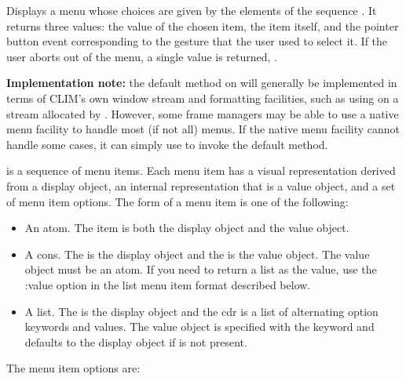 Displays a menu whose choices are given by the elements of the sequence
.  It returns three values:  the value of the chosen item, the item
itself, and the pointer button event corresponding to the gesture that the user
used to select it.  If the user aborts out of the menu, a single value is
returned, .

{\bf Implementation note:} the default method on 
will generally be implemented in terms of CLIM's own window stream and
formatting facilities, such as using  on a stream
allocated by .  However, some frame managers may be able to use a
native menu facility to handle most (if not all) menus.  If the native menu
facility cannot handle some cases, it can simply use  to
invoke the default method.

 is a sequence of menu items.  Each menu item has a visual
representation derived from a display object, an internal representation that is
a value object, and a set of menu item options.  The form of a menu item is one
of the following:

\begin{itemize}
\item An atom. The item is both the display object and the value object.

\item A cons. The  is the display object and the  is the value
object.  The value object must be an atom. If you need to return a list as the
value, use the :value option in the list menu item format described below.

\item A list. The  is the display object and the cdr is a list of
alternating option keywords and values.  The value object is specified with the
keyword  and defaults to the display object if  is not
present.
\end{itemize}

The menu item options are: 

